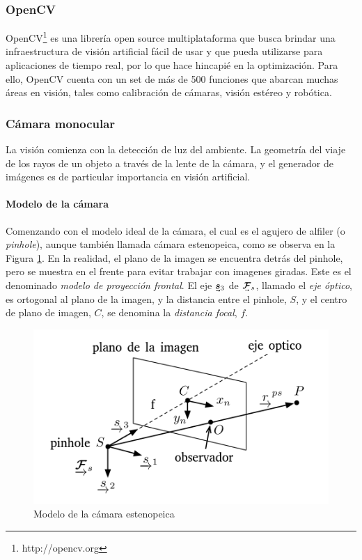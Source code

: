 \subsubsection{OpenCV}
OpenCV\footnote{http://opencv.org} es una librería open source multiplataforma que busca brindar una infraestructura de visión artificial fácil de usar y que pueda utilizarse para aplicaciones de tiempo real, por lo que hace hincapié en la optimización. Para ello, OpenCV cuenta con un set de más de 500 funciones \cite{kaehler2017} que abarcan muchas áreas en visión, tales como calibración de cámaras, visión estéreo y robótica.

\subsubsection{Cámara monocular}
La visión comienza con la detección de luz del ambiente. La geometría del viaje de los rayos de un objeto a través de la lente de la cámara, y el generador de imágenes es de particular importancia en visión artificial.


\paragraph{Modelo de la cámara}
Comenzando con el modelo ideal de la cámara, el cual es el agujero de alfiler (o \textit{pinhole}), aunque también llamada cámara estenopeica, como se observa en la Figura \ref{fig:pinholecamera}. 
En la realidad, el plano de la imagen se encuentra detrás del pinhole, pero se muestra en el frente para evitar trabajar con imagenes giradas. Este es el denominado \textit{modelo de proyección frontal}. El eje $\undervec{\bm{s}}_3$ de $\undervec{\bm{\mathcal{F}}}_s$, llamado el \textit{eje 
óptico}, es ortogonal al plano de la imagen, y la distancia entre el pinhole, $S$, y el centro de plano de imagen, $C$,  se denomina la \textit{distancia focal}, $f$.
\begin{figure}
    \centering
    \includegraphics[width=\linewidth]{Img/PinholeCamera.png}
    \caption{Modelo de la cámara estenopeica}
    \label{fig:pinholecamera}
\end{figure}

